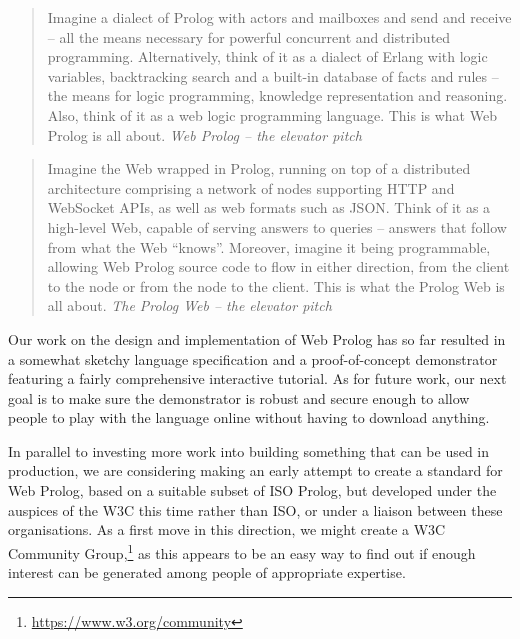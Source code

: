 \documentclass{tlp}
\begin{document}
\begin{quote}
Imagine a dialect of Prolog with actors and mailboxes and send and receive -- all the means necessary for powerful concurrent and distributed programming.  Alternatively, think of it as a dialect of Erlang with logic variables, backtracking search and a built-in database of facts and rules -- the means for logic programming, knowledge representation and reasoning. Also, think of it as a web logic programming language. This is what Web Prolog is all about.
\flushright\textit{Web Prolog -- the elevator pitch}
\end{quote}

\vspace{0.2cm}

\begin{quote}
Imagine the Web wrapped in Prolog, running on top of a distributed architecture comprising a network of nodes supporting HTTP and WebSocket APIs, as well as web formats such as JSON. Think of it as a high-level Web, capable of serving answers to queries -- answers that follow from what the Web ``knows''. Moreover, imagine it being programmable, allowing Web Prolog source code to flow in either direction, from the client to the node or from the node to the client. This is what the Prolog Web is all about.
\vspace{-3mm}\flushright\textit{The Prolog Web -- the elevator pitch}
\end{quote}

\vspace{2mm}

\noindent Our work on the design and implementation of Web Prolog has so far resulted in a somewhat sketchy language specification and a proof-of-concept demonstrator featuring a fairly comprehensive interactive tutorial. As for future work, our next goal is to make sure the demonstrator is robust and secure enough to allow people to play with the language online without having to download anything.

In parallel to investing more work into building something that can be used in production, we are considering making an early attempt to create a standard for Web Prolog, based on a suitable subset of ISO Prolog, but developed under the auspices of the W3C this time rather than ISO, or under a liaison between these organisations. As a first move in this direction, we might create a W3C Community Group,\footnote{\url{https://www.w3.org/community}} as this appears to be an easy way to find out if enough interest can be generated among people of appropriate expertise.
\end{document}
